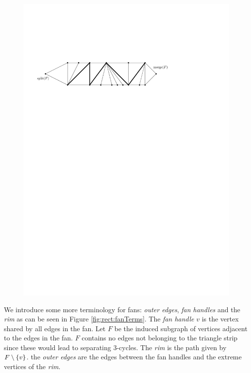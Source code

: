    \begin{figure}[h]
      \centering
      \includegraphics[scale=.9]{rectangularDuals/img/fans}
      \caption{}
      \label{fig:uni:fans}
    \end{figure}


   We introduce some more terminology for fans: \emph{outer edges}, \emph{fan handles} and the \emph{rim} as can be seen in Figure \ref{fig:rect:fanTerms}. The \emph{fan handle} $v$ is the vertex shared by all edges in the fan. Let $F$ be the induced subgraph of vertices adjacent to the edges in the fan. $F$ contains no edges not belonging to the triangle strip since these would lead to separating 3-cycles. The \emph{rim} is the path given by $F\setminus \left\lbrace {v} \right\rbrace$.
    the \emph{outer edges} are the edges between the fan handles and the extreme vertices of the \emph{rim}.

